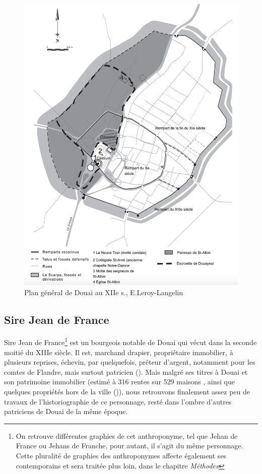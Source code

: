 \begin{figure}[ht] %
    \centering
    \includegraphics[scale=1]{1.Introduction/Img/Plan général de la ville de Douai avec les enceintes successives. DAO : E. Leroy-Langelin.png} 
    \caption{Plan général de Douai au XIIe s., E.Leroy-Langelin}
\end{figure}

\subsection{Sire Jean de France}
Sire Jean de France\footnote{On retrouve différentes graphies de cet anthroponyme, tel que \og Jehan de France\fg{} ou \og Jehans de Franche\fg{}, pour autant, il s'agit du même personnage. Cette pluralité de graphies des anthroponymes affecte également ses contemporains et sera traitée plus loin, dans le chapitre \textit{Méthodes}} est un bourgeois notable de Douai qui vécut dans la seconde moitié du XIIIe siècle. Il est, marchand drapier, propriétaire immobilier, à plusieurs reprises, échevin, par quelquefois, prêteur d'argent, notamment pour les comtes de Flandre, mais surtout patricien (\cite{espinas_les_1933}). 
Mais malgré ses titres à Douai et son patrimoine immobilier (estimé à 316 rentes sur 529 maisons , ainsi que quelques propriétés hors de la ville (\cite{blockmans_trois_1941})), nous retrouvons finalement assez peu de travaux de l'historiographie de ce personnage, resté dans l'ombre d'autres patriciens de Douai de la même époque.

